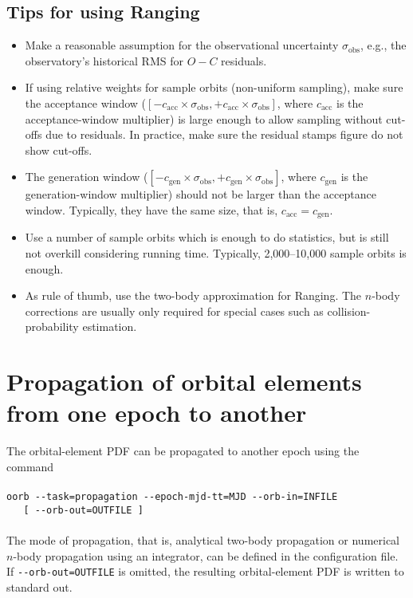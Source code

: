\documentclass[12pt,english,twoside,a4paper]{report}
\begin{document}
\subsection{Tips for using Ranging}

\begin{itemize}

\item Make a reasonable assumption for the observational uncertainty
  $\sigma_\mathrm{obs}$, e.g., the observatory's historical RMS for
  $O-C$ residuals.

\item If using relative weights for sample orbits (non-uniform
  sampling), make sure the acceptance window ($[-c_\mathrm{acc} \times
    \sigma_\mathrm{obs},+c_\mathrm{acc} \times \sigma_\mathrm{obs}]$,
  where $c_\mathrm{acc}$ is the acceptance-window multiplier) is large
  enough to allow sampling without cut-offs due to residuals. In
  practice, make sure the residual stamps figure do not show cut-offs.

\item The generation window ($[-c_\mathrm{gen} \times
  \sigma_\mathrm{obs},+c_\mathrm{gen} \times \sigma_\mathrm{obs}]$,
  where $c_\mathrm{gen}$ is the generation-window multiplier) should
  not be larger than the acceptance window. Typically, they have the
  same size, that is, $c_\mathrm{acc}=c_\mathrm{gen}$.

\item Use a number of sample orbits which is enough to do statistics,
  but is still not overkill considering running time. Typically,
  2,000--10,000 sample orbits is enough.

\item As rule of thumb, use the two-body approximation for
  Ranging. The $n$-body corrections are usually only required for
  special cases such as collision-probability estimation.

\end{itemize}

\section{Propagation of orbital elements from one epoch to another}

The orbital-element PDF can be propagated to another epoch using
the command \\ \\
\verb|oorb --task=propagation --epoch-mjd-tt=MJD --orb-in=INFILE| \\
\verb|   [ --orb-out=OUTFILE ]| \\ \\
The mode of propagation, that is, analytical two-body propagation or
numerical $n$-body propagation using an integrator, can be defined in
the configuration file. If \verb|--orb-out=OUTFILE| is omitted, the
resulting orbital-element PDF is written to standard out.
\end{document}
